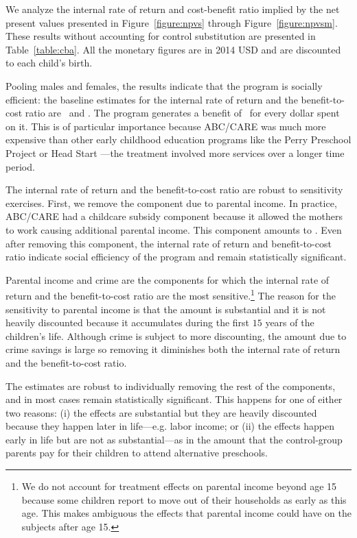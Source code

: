 We analyze the internal rate of return and cost-benefit ratio implied by the net present values presented in Figure~\ref{figure:npvs} through Figure~\ref{figure:npvsm}. These results without accounting for control substitution are presented in Table~\ref{table:cba}. All the monetary figures are in 2014 USD and are discounted to each child's birth.

Pooling males and females, the results indicate that the program is socially efficient: the baseline estimates for the internal rate of return and the benefit-to-cost ratio are \irrp\ and \bcp. The program generates a benefit of \bcp\ for every dollar spent on it. This is of particular importance because ABC/CARE was much more expensive than other early childhood education programs like the Perry Preschool Project or Head Start \citep{Elango_Hojman_etal_2016_Early-Edu}---the treatment involved more services over a longer time period.

The internal rate of return and the benefit-to-cost ratio are robust to sensitivity exercises. First, we remove the component due to parental income. In practice, ABC/CARE had a childcare subsidy component because it allowed the mothers to work causing additional parental income. This component amounts to \parincomenpvp. Even after removing this component, the internal rate of return and benefit-to-cost ratio indicate social efficiency of the program and remain statistically significant.

Parental income and crime are the components for which the internal rate of return and the benefit-to-cost ratio are the most sensitive.\footnote{We do not account for treatment effects on parental income beyond age 15 because some children report to move out of their households as early as this age. This makes ambiguous the effects that parental income could have on the subjects after age 15.} The reason for the sensitivity to parental income is that the amount is substantial and it is not heavily discounted because it accumulates during the first $15$ years of the children's life. Although crime is subject to more discounting, the amount due to crime savings is large so removing it diminishes both the internal rate of return and the benefit-to-cost ratio.

The estimates are robust to individually removing the rest of the components, and in most cases remain statistically significant. This happens for one of either two reasons: (i) the effects are substantial but they are heavily discounted because they happen later in life---e.g. labor income; or (ii) the effects happen early in life but are not as substantial---as in the amount that the control-group parents pay for their children to attend alternative preschools.

